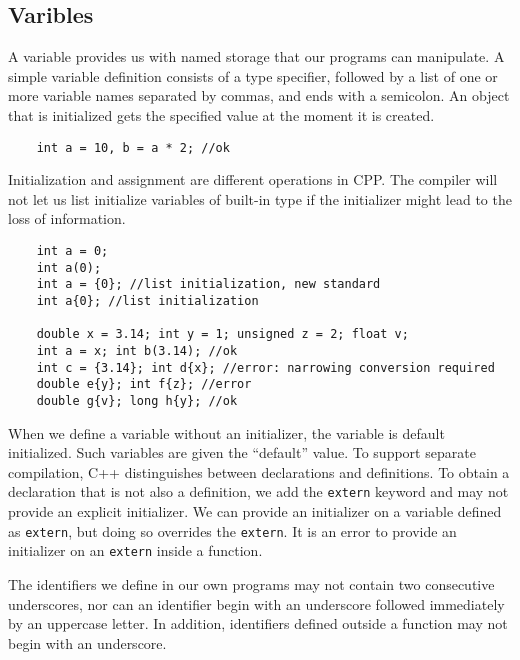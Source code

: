 \documentclass[11pt]{ctexart}
\begin{document}
\subsection{Varibles}
A variable provides us with named storage that our programs can manipulate. A simple variable definition consists of a type specifier, followed by a list of one or more variable names separated by commas, and ends with a semicolon. An object that is initialized gets the specified value at the moment it is created.\begin{lstlisting}
    int a = 10, b = a * 2; //ok
\end{lstlisting}
Initialization and assignment are different operations in CPP. The compiler will not let us list initialize variables of built-in type if
the initializer might lead to the loss of information.\begin{lstlisting}
    int a = 0;
    int a(0);
    int a = {0}; //list initialization, new standard
    int a{0}; //list initialization

    double x = 3.14; int y = 1; unsigned z = 2; float v;
    int a = x; int b(3.14); //ok
    int c = {3.14}; int d{x}; //error: narrowing conversion required
    double e{y}; int f{z}; //error
    double g{v}; long h{y}; //ok
\end{lstlisting}
When we define a variable without an initializer, the variable is default initialized. Such variables are given the “default” value. To support separate compilation, C++ distinguishes between declarations and definitions. To obtain a declaration that is not also a definition, we add the \verb|extern| keyword and may not provide an explicit initializer. We can provide an initializer on a variable defined as \verb|extern|, but doing so overrides the \verb|extern|. It is an error to provide an initializer on an \verb|extern| inside a function.\par
The identifiers we define in our own programs may not contain two consecutive underscores, nor can an identifier begin with an underscore followed immediately by an uppercase letter. In addition, identifiers defined outside a function may not begin with an underscore.
\end{document}
